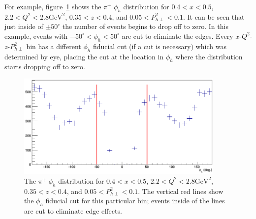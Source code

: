 For example, figure~\ref{fig:rec_pip_phih_x3_QQ0_z7_PT21} shows the $\pi^+$ $\phi_h$ distribution for $0.4 < x < 0.5$, $2.2 < Q^2 < 2.8 \text{GeV}^2$, $0.35 < z < 0.4$, and $0.05 < P_{h\perp}^2 < 0.1$.
It can be seen that just inside of $\pm 50^\circ$ the number of events begins to drop off to zero.
In this example, events with $-50^\circ < \phi_h < 50^\circ$ are cut to eliminate the edges.
Every $x$-$Q^2$-$z$-$P_{h\perp}^2$ bin has a different $\phi_h$ fiducial cut (if a cut is necessary) which was determined by eye, placing the cut at the location in $\phi_h$ where the distribution starts dropping off to zero.
%
\begin{figure}[htp]
\centering
\includegraphics[width=4in]{figures/rec_pip_phih_x3_QQ0_z7_PT21.png}
\caption{The $\pi^+$ $\phi_h$ distribution for $0.4 < x < 0.5$, $2.2 < Q^2 < 2.8 \text{GeV}^2$, $0.35 < z < 0.4$, and $0.05 < P_{h\perp}^2 < 0.1$. The vertical red lines show the $\phi_h$ fiducial cut for this particular bin; events inside of the lines are cut to eliminate edge effects.}
\label{fig:rec_pip_phih_x3_QQ0_z7_PT21}
\end{figure}
%
